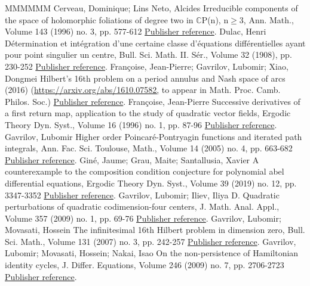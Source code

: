 \documentclass[11pt]{article}
\theoremstyle{definition}
\numberwithin{equation}{section}
\numberwithin{figure}{section}
\numberwithin{table}{section}
\begin{document}
\begin{thebibliography}{MMMMMM}
 Cerveau, Dominique; Lins Neto, Alcides Irreducible components of the space of holomorphic foliations of degree two in \(\mathbb{C}\)P(n), n\(\geq\)3, Ann. Math., Volume 143 (1996) no. 3, pp. 577-612 \href{https://ahl.centre-mersenne.org/item/AHL_2020__3__615_0/#cerlin96}{Publisher reference}.
 Dulac, Henri Détermination et intégration d’une certaine classe d’équations différentielles ayant pour point singulier un centre, Bull. Sci. Math. II. Sér., Volume 32 (1908), pp. 230-252 \href{https://ahl.centre-mersenne.org/item/AHL_2020__3__615_0/#dul08}{Publisher reference}.
 Françoise, Jean-Pierre; Gavrilov, Lubomir; Xiao, Dongmei Hilbert’s 16th problem on a period annulus and Nash space of arcs (2016) (\url{https://arxiv.org/abs/1610.07582,} to appear in Math. Proc. Camb. Philos. Soc.) \href{https://ahl.centre-mersenne.org/item/AHL_2020__3__615_0/#gavr16}{Publisher reference}.
 Françoise, Jean-Pierre Successive derivatives of a first return map, application to the study of quadratic vector fields, Ergodic Theory Dyn. Syst., Volume 16 (1996) no. 1, pp. 87-96 \href{https://ahl.centre-mersenne.org/item/AHL_2020__3__615_0/#fran96}{Publisher reference}.
 Gavrilov, Lubomir Higher order Poincaré-Pontryagin functions and iterated path integrals, Ann. Fac. Sci. Toulouse, Math., Volume 14 (2005) no. 4, pp. 663-682 \href{https://ahl.centre-mersenne.org/item/AHL_2020__3__615_0/#gavr05}{Publisher reference}.
 Giné, Jaume; Grau, Maite; Santallusia, Xavier A counterexample to the composition condition conjecture for polynomial abel differential equations, Ergodic Theory Dyn. Syst., Volume 39 (2019) no. 12, pp. 3347-3352 \href{https://ahl.centre-mersenne.org/item/AHL_2020__3__615_0/#ggs18}{Publisher reference}.
 Gavrilov, Lubomir; Iliev, Iliya D. Quadratic perturbations of quadratic codimension-four centers, J. Math. Anal. Appl., Volume 357 (2009) no. 1, pp. 69-76 \href{https://ahl.centre-mersenne.org/item/AHL_2020__3__615_0/#gail09}{Publisher reference}.
 Gavrilov, Lubomir; Movasati, Hossein The infinitesimal 16th Hilbert problem in dimension zero, Bull. Sci. Math., Volume 131 (2007) no. 3, pp. 242-257 \href{https://ahl.centre-mersenne.org/item/AHL_2020__3__615_0/#gamo07}{Publisher reference}.
 Gavrilov, Lubomir; Movasati, Hossein; Nakai, Isao On the non-persistence of Hamiltonian identity cycles, J. Differ. Equations, Volume 246 (2009) no. 7, pp. 2706-2723 \href{https://ahl.centre-mersenne.org/item/AHL_2020__3__615_0/#gmn09}{Publisher reference}.

\end{thebibliography}
\end{document}
